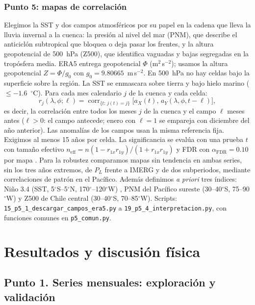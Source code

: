 \documentclass[11pt,a4paper]{article}
\newcommand{\archivo}[1]{\nolinkurl{#1}}
\newcommand{\PL}{P_L}
\begin{document}
\subsubsection{Punto 5: mapas de correlación}
Elegimos la SST y dos campos atmosféricos por su papel en la cadena que lleva la lluvia invernal a la cuenca: la presión al nivel del mar (PNM), que describe el anticiclón subtropical que bloquea o deja pasar los frentes, y la altura geopotencial de 500~hPa (Z500), que identifica vaguadas y bajas segregadas en la tropósfera media. ERA5 entrega geopotencial $\Phi$ (m$^2$\,s$^{-2}$); usamos la altura geopotencial $Z=\Phi/g_0$ con $g_0=9.80665$~m\,s$^{-2}$. En 500~hPa no hay celdas bajo la superficie sobre la región. La SST se enmascara sobre tierra y bajo hielo marino ($\leq-1.6$~$^\circ$C). Para cada mes calendario $j$ de la cuenca y cada celda:
\begin{equation}
r_j(\lambda,\phi;\ell)=\operatorname{corr}_{\{t:\,j(t)=j\}}\big[a_X(t),\,a_Y(\lambda,\phi,t-\ell)\big],
\end{equation}
es decir, la correlación entre todos los meses $j$ de la cuenca y el campo $\ell$ meses antes ($\ell>0$: el campo antecede; enero con $\ell=1$ se empareja con diciembre del año anterior). Las anomalías de los campos usan la misma referencia fija. Exigimos al menos 15 años por celda. La significancia se evalúa con una prueba $t$ con tamaño efectivo $n_{\mathrm{eff}}=n(1-r_{1x}r_{1y})/(1+r_{1x}r_{1y})$ \citep{Bretherton1999} y FDR con $\alpha_{\mathrm{FDR}}=0.10$ por mapa \citep{Wilks2016}. Para la robustez comparamos mapas sin tendencia en ambas series, sin los tres años extremos, de $\PL$ frente a IMERG y de dos subperiodos, mediante correlaciones de patrón en el Pacífico. Además definimos \emph{a priori} tres índices: Niño 3.4 (SST, 5$^\circ$S--5$^\circ$N, 170$^\circ$--120$^\circ$W) \citep{Trenberth1997}, PNM del Pacífico sureste (30--40$^\circ$S, 75--90$^\circ$W) y Z500 de Chile central (30--40$^\circ$S, 70--85$^\circ$W). Scripts: \archivo{15_p5_1_descargar_campos_era5.py} a \archivo{19_p5_4_interpretacion.py}, con funciones comunes en \archivo{p5_comun.py}.
\section{Resultados y discusión física}
\label{sec:resultados}

\subsection{Punto 1. Series mensuales: exploración y validación}
\label{sec:p1}
\end{document}
